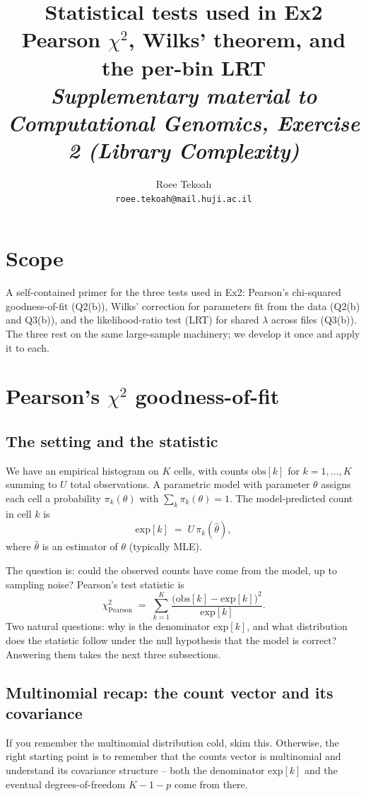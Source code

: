 \documentclass[11pt]{article}
\title{\vspace{-2em}\textbf{Statistical tests used in Ex2}\\[0.3em]\large
Pearson $\chi^{2}$, Wilks' theorem, and the per-bin LRT\\[0.6em]
\normalsize \textit{Supplementary material to Computational Genomics, Exercise 2 (Library Complexity)}}
\author{Roee Tekoah \\ \texttt{roee.tekoah@mail.huji.ac.il}}
\date{}
\newcommand{\obs}{\mathrm{obs}}
\newcommand{\expc}{\mathrm{exp}}
\begin{document}
\maketitle
\vspace{-1.5em}

\section*{Scope}
A self-contained primer for the three tests used in Ex2: Pearson's
chi-squared goodness-of-fit (Q2(b)), Wilks' correction for parameters fit from
the data (Q2(b) and Q3(b)), and the likelihood-ratio test (LRT) for shared
$\lambda$ across files (Q3(b)). The three rest on the same large-sample
machinery; we develop it once and apply it to each.

\tableofcontents

\section{Pearson's $\chi^{2}$ goodness-of-fit}

\subsection{The setting and the statistic}

We have an empirical histogram on $K$ cells, with counts $\obs[k]$ for
$k = 1, \dots, K$ summing to $U$ total observations. A parametric model with
parameter $\theta$ assigns each cell a probability $\pi_k(\theta)$ with
$\sum_k \pi_k(\theta) = 1$. The model-predicted count in cell $k$ is
\[
   \expc[k] \;=\; U\,\pi_k(\hat\theta),
\]
where $\hat\theta$ is an estimator of $\theta$ (typically MLE).

The question is: could the observed counts have come from the model, up to
sampling noise? Pearson's test statistic is
\[
   \chi^{2}_{\text{Pearson}}
   \;=\; \sum_{k=1}^{K} \frac{\bigl(\obs[k] - \expc[k]\bigr)^{2}}{\expc[k]}.
\]
Two natural questions: why is the denominator $\expc[k]$, and what
distribution does the statistic follow under the null hypothesis that the
model is correct? Answering them takes the next three subsections.

\subsection{Multinomial recap: the count vector and its covariance}

If you remember the multinomial distribution cold, skim this. Otherwise, the
right starting point is to remember that the counts vector is multinomial
and understand its covariance structure -- both the denominator $\expc[k]$
and the eventual degrees-of-freedom $K - 1 - p$ come from there.
\end{document}

